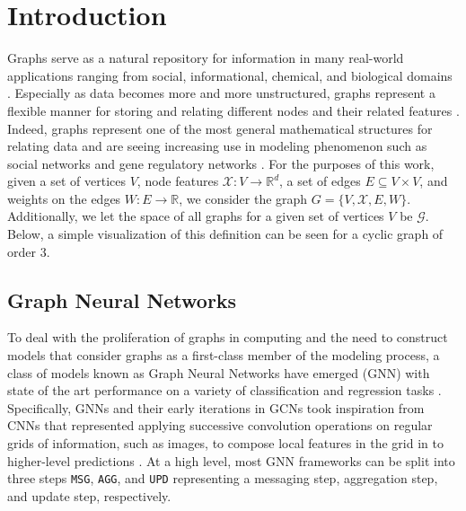 \section{Introduction}
Graphs serve as a natural repository for information in many real-world applications ranging from social, informational, chemical, and biological domains \cite{cho_friendship_2011}. Especially as data becomes more and more unstructured, graphs represent a flexible manner for storing and relating different nodes and their related features \cite{washio_state_2003}. Indeed, graphs represent one of the most general mathematical structures for relating data and are seeing increasing use in modeling phenomenon such as social networks and gene regulatory networks \cite{washio_state_2003,petralia_new_2016}. For the purposes of this work, given a set of vertices $V$, node features $\mathcal{X} : V \rightarrow \mathbb{R}^{d}$, a set of edges $E \subseteq V \times V$, and weights on the edges $W : E \rightarrow \mathbb{R}$, we consider the graph $G = \{V, \mathcal{X}, E, W\}$. Additionally, we let the space of all graphs for a given set of vertices $V$ be $\mathcal{G}$. Below, a simple visualization of this definition can be seen for a cyclic graph of order 3.
\begin{figure}[H]
  \centering
  
 \end{figure}

\subsection{Graph Neural Networks}
To deal with the proliferation of graphs in computing and the need to construct models that consider graphs as a first-class member of the modeling process, a class of models known as Graph Neural Networks have emerged (GNN) with state of the art performance on a variety of classification and regression tasks \cite{ying_gnnexplainer_2019}. Specifically, GNNs and their early iterations in GCNs took inspiration from CNNs that represented applying successive convolution operations on regular grids of information, such as images, to compose local features in the grid in to higher-level predictions \cite{defferrard_convolutional_2017}. At a high level, most GNN frameworks can be split into three steps \verb|MSG|, \verb|AGG|, and \verb|UPD| representing a messaging step, aggregation step, and update step, respectively.

